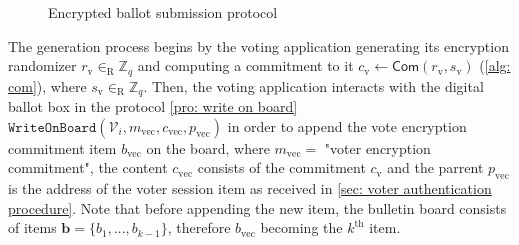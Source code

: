 \begin{figure}[ht]
    \caption{Encrypted ballot submission protocol}
    \label{fig: encrypted ballot submission protocol}
\end{figure}

The generation process begins by the voting application generating its encryption randomizer $r_\mathrm{v} \in_\mathrm{R} \mathbb{Z}_q$ and computing a commitment to it $c_\mathrm{v} \gets \mathsf{Com}(r_\mathrm{v}, s_\mathrm{v})$ (\cref{alg: com}), where $s_\mathrm{v} \in_\mathrm{R} \mathbb{Z}_q$. Then, the voting application interacts with the digital ballot box in the protocol \ref{pro: write on board} $\mathtt{WriteOnBoard}(\mathcal{V}_i, m_\mathrm{vec}, c_\mathrm{vec}, p_\mathrm{vec})$ in order to append the vote encryption commitment item $b_\mathrm{vec}$ on the board, where $m_\mathrm{vec} =$ "voter encryption commitment", the content $c_\mathrm{vec}$ consists of the commitment $c_\mathrm{v}$ and the parrent $p_\mathrm{vec}$ is the address of the voter session item as received in \cref{sec: voter authentication procedure}. Note that before appending the new item, the bulletin board consists of items $\boldsymbol{b} = \{ b_1, ..., b_{k-1} \}$, therefore $b_\mathrm{vec}$ becoming the $k^\mathrm{th}$ item.


